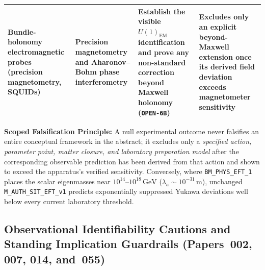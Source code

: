 \begin{table}[htbp]
\begin{tabular}{|p{3.3cm}|p{2.9cm}|p{4.2cm}|p{4.1cm}|}
\hline
\textbf{Bundle-holonomy electromagnetic probes} (precision magnetometry, SQUIDs) & Precision magnetometry and Aharonov--Bohm phase interferometry & Establish the visible $U(1)_{\mathrm{EM}}$ identification and prove any non-standard correction beyond Maxwell holonomy (\texttt{OPEN-6B}) & Excludes only an explicit beyond-Maxwell extension once its derived field deviation exceeds magnetometer sensitivity \\
\hline
\end{tabular}
\end{table}

\noindent
\textbf{Scoped Falsification Principle:} A null experimental outcome never falsifies an entire conceptual framework in the abstract; it excludes only a \emph{specified action, parameter point, matter closure, and laboratory preparation model} after the corresponding observable prediction has been derived from that action and shown to exceed the apparatus's verified sensitivity. Conversely, where \texttt{BM\_PHYS\_EFT\_1} places the scalar eigenmasses near $10^{14}\text{--}10^{18}\,\mathrm{GeV}$ ($\lambda_a \sim 10^{-31}\,\mathrm{m}$), unchanged \texttt{M\_AUTH\_SIT\_EFT\_v1} predicts exponentially suppressed Yukawa deviations well below every current laboratory threshold.

\subsection{Observational Identifiability Cautions and Standing Implication Guardrails (Papers~002, 007, 014, and~055)}
\label{subsec:identifiability-and-qgtcd-guardrails}

